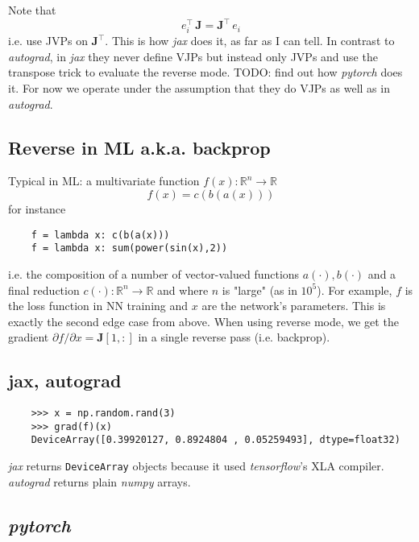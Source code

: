 \documentclass[parskip,paper=a4,11pt,headsepline]{scrartcl}
\newcommand{\ve}[1]{\ensuremath{\bm{\mathit{#1}}}}
\newcommand{\ma}[1]{\ensuremath{\bm{\mathbf{#1}}}}
\newcommand{\ra}{\ensuremath{\rightarrow}}
\newcommand{\pdi}[2]{\partial #1/\partial #2}
\newcommand{\soft}[1]{\textsl{#1}\xspace}
\newcommand{\numpy}{\soft{numpy}}
\newcommand{\pytorch}{\soft{pytorch}}
\newcommand{\jax}{\soft{jax}}
\newcommand{\autograd}{\soft{autograd}}
\newcommand{\tf}{\soft{tensorflow}}
\newcommand{\co}[1]{\texttt{#1}}
\begin{document}
Note that
\begin{equation*}
    \ve e_i^\top\,\ma J = \ma J^\top\,\ve e_i
\end{equation*}
i.e. use JVPs on $\ma J^\top$. This is how \jax does it, as far as I
can tell. In contrast to \autograd, in \jax they never define
VJPs but instead only JVPs and use the transpose trick to evaluate the reverse
mode. TODO: find out how \pytorch does it. For now we operate under the
assumption that they do VJPs as well as in \autograd.

\subsection{Reverse in ML a.k.a. backprop}

Typical in ML: a multivariate function $f(\ve x): \mathbb R^n\ra \mathbb R$
\begin{equation*}
    f(\ve x) = c(\ve b(\ve a(\ve x)))
\end{equation*}
for instance
\begin{verbatim}
    f = lambda x: c(b(a(x)))
    f = lambda x: sum(power(sin(x),2))
\end{verbatim}
i.e. the composition of a number of vector-valued functions $\ve a(\cdot), \ve
b(\cdot)$ and a final reduction $c(\cdot): \mathbb R^n\ra \mathbb R$ and where
$n$ is "large" (as in $10^5$). For example, $f$ is the loss function in NN
training and $\ve x$ are the network's parameters. This is exactly the second
edge case from above. When using reverse mode, we get the gradient $\pdi{f}{\ve
x} = \ma J[1,:]$ in a single reverse pass (i.e. backprop).

\subsection{jax, autograd}

\begin{verbatim}
    >>> x = np.random.rand(3)
    >>> grad(f)(x)
    DeviceArray([0.39920127, 0.8924804 , 0.05259493], dtype=float32)
\end{verbatim}

\jax returns \co{DeviceArray} objects because it used \tf's XLA compiler.
\autograd returns plain \numpy arrays.

\subsection{\pytorch}
\end{document}
